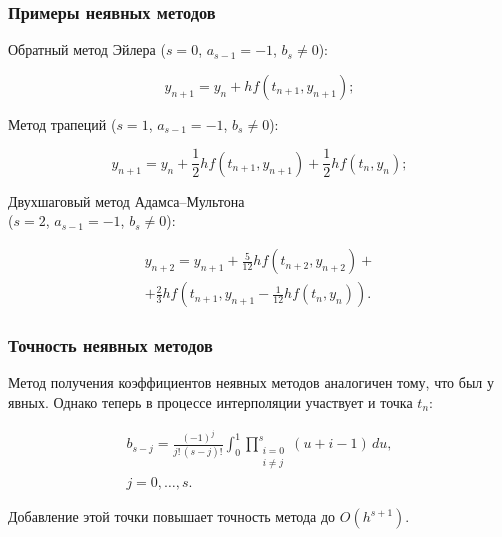 \begin{frame}
\frametitle{Примеры неявных методов}

Обратный метод Эйлера ($s = 0$, $a_{s-1} = -1$, $b_s \neq 0$):

\su
\begin{equation}
  y_{n+1} = y_n + h f(t_{n+1}, y_{n+1});
\end{equation}

Метод трапеций ($s = 1$, $a_{s-1} = -1$, $b_s \neq 0$):

\su
\begin{equation}
  y_{n+1} = y_n + \frac{1}{2} h f(t_{n+1}, y_{n+1}) + \frac{1}{2} h f(t_n, y_n);
\end{equation}

Двухшаговый метод Адамса--Мультона \\
($s = 2$, $a_{s-1} = -1$, $b_s \neq 0$):

\su
\begin{equation}
\begin{gathered}
  y_{n+2} = y_{n+1} + \frac{5}{12} h f(t_{n+2}, y_{n+2}) + \\
  + \frac{2}{3} h f(t_{n+1}, y_{n+1} - \frac{1}{12} h f(t_n, y_n)).
\end{gathered}
\end{equation}

\end{frame}

\begin{frame}
\frametitle{Точность неявных методов}

Метод получения коэффициентов неявных методов аналогичен тому, что был у явных. Однако теперь в процессе интерполяции участвует и точка $ t_n $:

\su
\begin{equation}
\begin{gathered}
  b_{s-j} = \frac{(-1)^j}{j! \, (s-j)!} \int_0^1 \prod_{\substack{i=0 \\ i \neq j}}^s(u + i - 1) \, du, \\
  j = 0, \ldots, s.
\end{gathered}
\end{equation}

Добавление этой точки повышает точность метода до $ O(h^{s+1}) $.

\end{frame}

